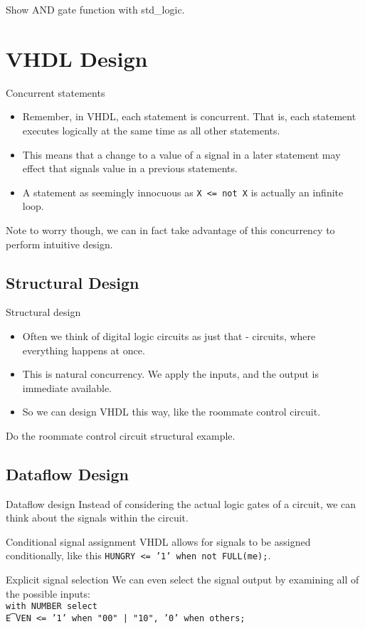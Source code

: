 Show AND gate function with std\_logic.

\section{VHDL Design}

\begin{frame}{Concurrent statements}
  \begin{itemize}
    \item Remember, in VHDL, each statement is concurrent.  That is, each statement executes logically at the same time as all other statements.
    \item This means that a change to a value of a signal in a later statement may effect that signals value in a previous statements.
    \item A statement as seemingly innocuous as \texttt{X <= not X} is actually an infinite loop.
  \end{itemize}
  Note to worry though, we can in fact take advantage of this concurrency to perform intuitive design.
\end{frame}

\subsection{Structural Design}

\begin{frame}{Structural design}
  \begin{itemize}
    \item Often we think of digital logic circuits as just that - circuits, where everything happens at once.
    \item This is natural concurrency.  We apply the inputs, and the output is immediate available.
    \item So we can design VHDL this way, like the roommate control circuit.
  \end{itemize}
\end{frame}

Do the roommate control circuit structural example.

\subsection{Dataflow Design}

\begin{frame}{Dataflow design}
  Instead of considering the actual logic gates of a circuit, we can think about the signals within the circuit.
  \begin{block}{Conditional signal assignment}
    VHDL allows for signals to be assigned conditionally, like this \texttt{HUNGRY <= '1' when not FULL(me);}.
  \end{block}
  \begin{block}{Explicit signal selection}
    We can even select the signal output by examining all of the possible inputs:\\
    \texttt{with NUMBER select\\ \t EVEN <= '1' when "00" | "10", '0' when others;}
  \end{block}
\end{frame}

